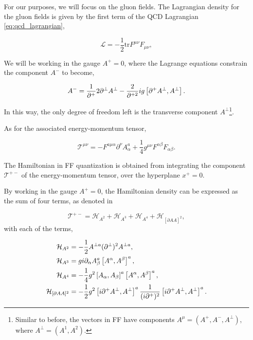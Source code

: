 \documentclass[11pt,a4paper,twoside,pdf]{article}
\numberwithin{equation}{section}
\begin{document}
For our purposes, we will focus on the gluon fields. The Lagrangian density for 
the gluon fields is given by the first term of the QCD Lagrangian \eqref{eq:qcd_lagrangian},

\begin{equation}
    \mathcal{L} = -\frac{1}{2}\text{tr}F^{\mu\nu}F_{\mu\nu},
\end{equation}

We will be working in the gauge $A^+=0$, where the Lagrange equations constrain
the component $A^-$ to become,

\begin{equation}
    A^- = \frac{1}{\partial^+}2 \partial^\perp A^\perp - \frac{2}{\partial^{+2}} ig 
    \left[ \partial^+ A^\perp, A^\perp \right].
\end{equation}

In this way, the only degree of freedom left is the transverse component $A^\perp$\footnote{Similar to before, the vectors in FF have components
$A^\mu = (A^+, A^-, A^\perp)$, where $A^\perp = (A^1, A^2)$.}.

As for the associated energy-momentum tensor,

\begin{equation}
    \mathcal{T}^{\mu\nu} = -F^{a\mu\alpha}\partial^\nu A^a_\alpha + 
    \frac{1}{4}g^{\mu\nu}F^{\alpha\beta} F_{\alpha\beta}.
\end{equation}

The Hamiltonian in FF quantization is obtained from integrating the component
$\mathcal{T}^{+-}$ of the energy-momentum tensor, over the hyperplane $x^+=0$. 

By working in the gauge $A^+=0$, the Hamiltonian density can be expressed as the sum of 
four terms, as denoted in \cite{glazek_dynamics_2001}

\begin{equation}
    \mathcal{T}^{+-} = \mathcal{H}_{A^2} + \mathcal{H}_{A^3} +
    \mathcal{H}_{A^4} + \mathcal{H}_{[\partial AA]^2},
\end{equation}
with each of the terms, 

\begin{align}
    \mathcal{H}_{A^2} &= -\frac{1}{2} A^{\perp a} (\partial^\perp)^2 A^{\perp a}, \\
    \mathcal{H}_{A^3} &= g i \partial_\alpha A^a_\beta \left[ A^\alpha, A^\beta \right]^a, \\
    \mathcal{H}_{A^4} &= -\frac{1}{4} g^2 \left[ A_\alpha, A_\beta \right]^a
    \left[ A^\alpha, A^\beta \right]^a, \\
    \mathcal{H}_{[\partial AA]^2} &= -\frac{1}{2} g^2 \left[ i \partial^+ A^\perp,
    A^\perp \right]^a  \frac{1}{(i\partial^+)^2} \left[ i\partial^+ A^\perp, A^\perp \right]^a.
\end{align}
\end{document}
